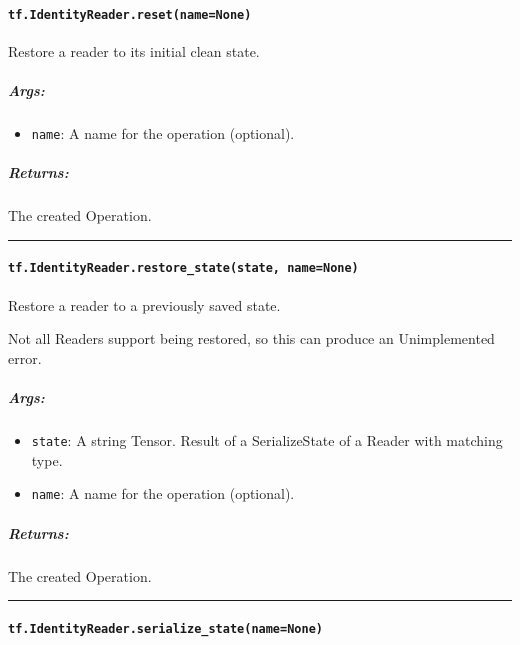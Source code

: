 \paragraph{\texorpdfstring{\texttt{tf.IdentityReader.reset(name=None)}
}{tf.IdentityReader.reset(name=None) }}\label{tf.identityreader.resetnamenone}

Restore a reader to its initial clean state.

\subparagraph{Args: }\label{args-26}

\begin{itemize}
\tightlist
\item
  \texttt{name}: A name for the operation (optional).
\end{itemize}

\subparagraph{Returns: }\label{returns-22}

The created Operation.

\begin{center}\rule{0.5\linewidth}{\linethickness}\end{center}

\paragraph{\texorpdfstring{\texttt{tf.IdentityReader.restore\_state(state,\ name=None)}
}{tf.IdentityReader.restore\_state(state, name=None) }}\label{tf.identityreader.restoreux5fstatestate-namenone}

Restore a reader to a previously saved state.

Not all Readers support being restored, so this can produce an
Unimplemented error.

\subparagraph{Args: }\label{args-27}

\begin{itemize}
\tightlist
\item
  \texttt{state}: A string Tensor. Result of a SerializeState of a
  Reader with matching type.
\item
  \texttt{name}: A name for the operation (optional).
\end{itemize}

\subparagraph{Returns: }\label{returns-23}

The created Operation.

\begin{center}\rule{0.5\linewidth}{\linethickness}\end{center}

\paragraph{\texorpdfstring{\texttt{tf.IdentityReader.serialize\_state(name=None)}
}{tf.IdentityReader.serialize\_state(name=None) }}\label{tf.identityreader.serializeux5fstatenamenone}

